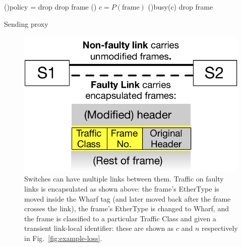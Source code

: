 \documentclass[sigconf]{acmart}
\newcommand{\OurSys}{Wharf\xspace}
\begin{document}
\begin{algorithm}
\SetAlgoLined
{}
\uIf(){policy = drop}{
drop frame
}\Else(){
  $c = P(\mathrm{frame})$ 
  \uIf(){busy(c)}{
drop frame
}
}
\caption{\label{alg:sending}Sending proxy}
\end{algorithm}


\begin{figure}
  \centering
  \includegraphics[width=0.3\paperwidth]{header_format.pdf}
  \caption{\label{fig:format}Switches can have multiple links between them.
  Traffic on faulty links is encapsulated as shown above: the frame's EtherType
  is moved inside the \OurSys tag (and later moved back after the frame crosses
  the link), the frame's EtherType is changed to \OurSys, and the frame is
  classified to a particular Traffic Class and given a transient link-local
  identifier: these are shown as $c$ and $n$ respectively in
  Fig.~\ref{fig:example-loss}.}
\end{figure}
\end{document}
